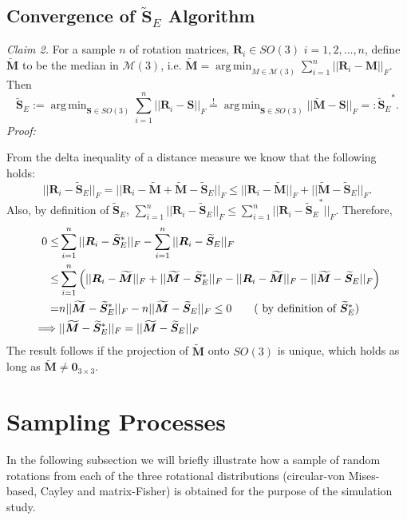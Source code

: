 \documentclass[12pt]{article}
\newcommand{\ProjMedian}{{\widetilde{\bm S}_E}}
\newcommand{\MMedian}{{\widetilde{\bm M}}}
\DeclareMathOperator*{\argmin}{arg\,min}
\begin{document}
\subsection{Convergence of $\ProjMedian$ Algorithm}
\textit{Claim 2.}  For a sample $n$ of rotation matrices, $\bm R_i\in SO(3)$ $i=1,2,\dots,n$, define $\MMedian$ to be the median in $\mathcal{M}(3)$, i.e. $\widetilde{\bm M}=\argmin_{M\in\mathcal{M}(3)}\sum_{i=1}^n||\bm R_i-\bm M||_F$.  Then 
\[
\ProjMedian:=\argmin_{\bm S\in SO(3)}\sum_{i=1}^n||\bm R_i-\bm S||_F \stackrel{!}{=}\argmin_{\bm S\in SO(3)}||\MMedian-\bm S||_F =: \ProjMedian^*.
\]
\noindent\textit{Proof:}  %

\noindent From the delta inequality of a distance measure we know that the following holds:
\[
||\bm R_i-\ProjMedian||_F=||\bm R_i-\MMedian+\MMedian-\ProjMedian||_F\leq||\bm R_i-\MMedian||_F+||\MMedian-\ProjMedian||_F.
\]
Also, by definition of $\ProjMedian$, $\sum_{i=1}^n||\bm R_i-\ProjMedian||_F \le \sum_{i=1}^n||\bm R_i-\ProjMedian^*||_F$.  Therefore,
\begin{align}\label{eq:contradiction}
0 \le& \sum_{i=1}^n||\bm R_i-\ProjMedian^*||_F-\sum_{i=1}^n||\bm R_i-\ProjMedian||_F\nonumber\\
\leq&\sum_{i=1}^n\left(||\bm R_i-\MMedian||_F+||\MMedian-\ProjMedian^*||_F-||\bm R_i-\MMedian||_F-||\MMedian-\ProjMedian||_F\right)\nonumber\\
=& n||\MMedian-\ProjMedian^*||_F-n||\MMedian-\ProjMedian||_F\nonumber \le 0 \tag{ by definition of $\ProjMedian^*$}\\
\implies&||\MMedian-\ProjMedian^*||_F = ||\MMedian-\ProjMedian||_F
\end{align}
The result follows if the projection of $\MMedian$ onto $SO(3)$ is unique, which holds as long as $\MMedian \neq \mathbf{0}_{3\times 3}$.


\section{Sampling Processes}
In the following subsection we will briefly illustrate how a sample of random rotations from each of the three rotational distributions (circular-von Mises-based, Cayley and matrix-Fisher) is obtained for the purpose of the simulation study.
\label{sec:appendix1}
\end{document}

